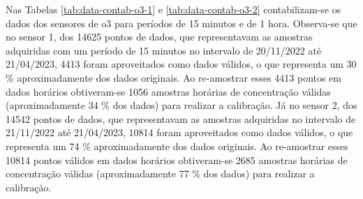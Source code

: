 Nas Tabelas \ref{tab:data-contab-o3-1} e \ref{tab:data-contab-o3-2} contabilizam-se os dados dos sensores de \acrshort{o3} para períodos de 15 minutos e de 1 hora. Observa-se que no sensor 1, dos 14625 pontos de dados, que representavam as amostras adquiridas com um período de 15 minutos no intervalo de 20/11/2022 até 21/04/2023, 4413 foram aproveitados como dados válidos, o que representa um 30 \% aproximadamente dos dados originais. Ao re-amostrar esses 4413 pontos em dados horários obtiveram-se 1056 amostras horárias de concentração válidas (aproximadamente 34 \% dos dados) para realizar a calibração. Já no sensor 2, dos 14542 pontos de dados, que representavam as amostras adquiridas no intervalo de 21/11/2022 até 21/04/2023, 10814 foram aproveitados como dados válidos, o que representa um 74 \% aproximadamente dos dados originais. Ao re-amostrar esses 10814 pontos válidos em dados horários obtiveram-se 2685 amostras horárias de concentração válidas (aproximadamente 77 \% dos dados) para realizar a calibração.

